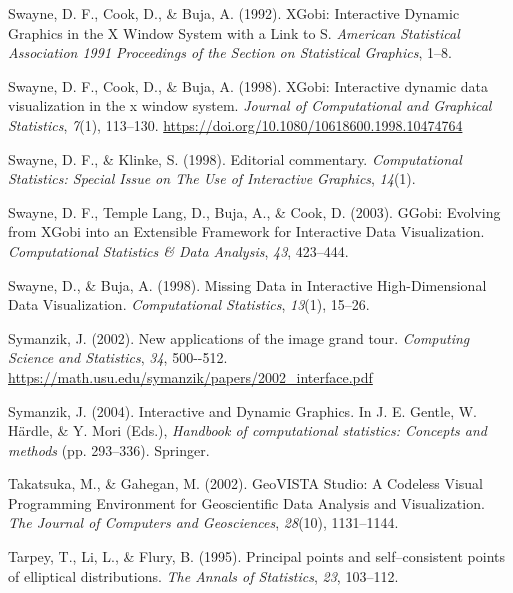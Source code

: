 \documentclass[
  letterpaper,
]{book}
\newlength{\cslhangindent}
\newlength{\cslentryspacingunit} %
\newenvironment{CSLReferences}[2] %
 {%
  \setlength{\parindent}{0pt}
  \ifodd #1
  \let\oldpar\par
  \def\par{\hangindent=\cslhangindent\oldpar}
  \fi
  \setlength{\parskip}{#2\cslentryspacingunit}
 }%
 {}
\begin{document}
\begin{CSLReferences}{1}{0}
\leavevmode{}%
Swayne, D. F., Cook, D., \& Buja, A. (1992). {XG}obi: {I}nteractive
{D}ynamic {G}raphics in the {X} {W}indow {S}ystem with a {L}ink to {S}.
\emph{American Statistical Association 1991 Proceedings of the Section
on Statistical Graphics}, 1--8.

\leavevmode{}%
Swayne, D. F., Cook, D., \& Buja, A. (1998). XGobi: Interactive dynamic
data visualization in the x window system. \emph{Journal of
Computational and Graphical Statistics}, \emph{7}(1), 113--130.
\url{https://doi.org/10.1080/10618600.1998.10474764}

\leavevmode{}%
Swayne, D. F., \& Klinke, S. (1998). Editorial commentary.
\emph{Computational Statistics: Special Issue on The Use of Interactive
Graphics}, \emph{14}(1).

\leavevmode{}%
Swayne, D. F., Temple Lang, D., Buja, A., \& Cook, D. (2003). {GG}obi:
{E}volving from {XG}obi into an {E}xtensible {F}ramework for
{I}nteractive {D}ata {V}isualization. \emph{Computational Statistics \&
Data Analysis}, \emph{43}, 423--444.

\leavevmode{}%
Swayne, D., \& Buja, A. (1998). {M}issing {D}ata in {I}nteractive
{H}igh-{D}imensional {D}ata {V}isualization. \emph{Computational
Statistics}, \emph{13}(1), 15--26.

\leavevmode{}%
Symanzik, J. (2002). New applications of the image grand tour.
\emph{Computing Science and Statistics}, \emph{34}, 500-\/-512.
\url{https://math.usu.edu/symanzik/papers/2002_interface.pdf}

\leavevmode{}%
Symanzik, J. (2004). Interactive and {D}ynamic {G}raphics. In J. E.
Gentle, W. Härdle, \& Y. Mori (Eds.), \emph{Handbook of computational
statistics: Concepts and methods} (pp. 293--336). Springer.

\leavevmode{}%
Takatsuka, M., \& Gahegan, M. (2002). {GeoVISTA Studio}: A {C}odeless
{V}isual {P}rogramming {E}nvironment for {G}eoscientific {D}ata
{A}nalysis and {V}isualization. \emph{The Journal of Computers and
Geosciences}, \emph{28}(10), 1131--1144.

\leavevmode{}%
Tarpey, T., Li, L., \& Flury, B. (1995). Principal points and
self--consistent points of elliptical distributions. \emph{The Annals of
Statistics}, \emph{23}, 103--112.


\end{CSLReferences}
\end{document}
